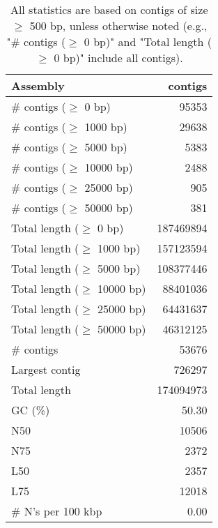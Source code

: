 \documentclass[12pt,a4paper]{article}
\begin{document}
\begin{table}[ht]
\begin{center}
\caption{All statistics are based on contigs of size $\geq$ 500 bp, unless otherwise noted (e.g., "\# contigs ($\geq$ 0 bp)" and "Total length ($\geq$ 0 bp)" include all contigs).}
\begin{tabular}{|l*{1}{|r}|}
\hline
Assembly & contigs \\ \hline
\# contigs ($\geq$ 0 bp) & 95353 \\ \hline
\# contigs ($\geq$ 1000 bp) & 29638 \\ \hline
\# contigs ($\geq$ 5000 bp) & 5383 \\ \hline
\# contigs ($\geq$ 10000 bp) & 2488 \\ \hline
\# contigs ($\geq$ 25000 bp) & 905 \\ \hline
\# contigs ($\geq$ 50000 bp) & 381 \\ \hline
Total length ($\geq$ 0 bp) & 187469894 \\ \hline
Total length ($\geq$ 1000 bp) & 157123594 \\ \hline
Total length ($\geq$ 5000 bp) & 108377446 \\ \hline
Total length ($\geq$ 10000 bp) & 88401036 \\ \hline
Total length ($\geq$ 25000 bp) & 64431637 \\ \hline
Total length ($\geq$ 50000 bp) & 46312125 \\ \hline
\# contigs & 53676 \\ \hline
Largest contig & 726297 \\ \hline
Total length & 174094973 \\ \hline
GC (\%) & 50.30 \\ \hline
N50 & 10506 \\ \hline
N75 & 2372 \\ \hline
L50 & 2357 \\ \hline
L75 & 12018 \\ \hline
\# N's per 100 kbp & 0.00 \\ \hline
\end{tabular}
\end{center}
\end{table}
\end{document}

